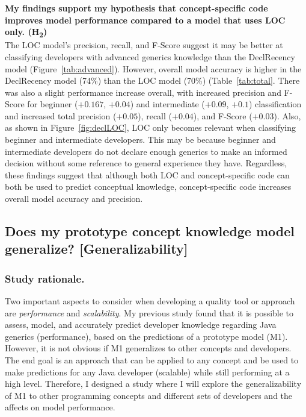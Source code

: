 \documentclass{llncs}
\begin{document}
\vspace{0.5em}

\noindent\textbf{My findings support my hypothesis that concept-specific code improves model performance compared to a model that uses LOC only. (H\textsubscript{2})}\\
The LOC model's precision, recall, and F-Score suggest it may be better at classifying developers with advanced generics knowledge than the DeclRecency model (Figure~\ref{tab:advanced}). However, overall model accuracy is higher in the DeclRecency model (74\%) than the LOC model (70\%) (Table~\ref{tab:total}. There was also a slight performance increase overall, with increased precision and F-Score for beginner (\(+ 0.167\), \(+ 0.04\)) and intermediate (\(+ 0.09\), \(+ 0.1\)) classification and increased total precision (\(+ 0.05\)), recall (\(+ 0.04\)), and F-Score (\(+ 0.03\)). Also, as shown in Figure~\ref{fig:declLOC}, LOC only becomes relevant when classifying beginner and intermediate developers. This may be because beginner and intermediate developers do not declare enough generics to make an informed decision without some reference to general experience they have.
Regardless, these findings suggest that although both LOC and concept-specific code can both be used to predict conceptual knowledge, concept-specific code increases overall model accuracy and precision.


\subsection{Does my prototype concept knowledge model generalize? [Generalizability]} \label{subsec:s4}

\subsubsection{Study rationale.} Two important aspects to consider when developing a quality tool or approach are \emph{performance} and \emph{scalability}. 
My previous study found that it is possible to assess, model, and accurately predict developer knowledge regarding Java generics (performance), based on the predictions of a prototype model (M1). However, it is not obvious if M1 generalizes to other concepts and developers.
The end goal is an approach that can be applied to any concept and be used to make predictions for any Java developer (scalable) while still performing at a high level. Therefore, I designed a study where I will explore the generalizability of M1 to other programming concepts and different sets of developers and the affects on model performance. 
\end{document}
